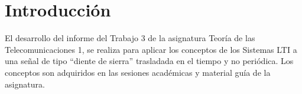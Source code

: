\section{Introducción}\label{intro}
   El desarrollo del informe del Trabajo 3 de la asignatura Teoría de las Telecomunicaciones 1, se realiza para aplicar los conceptos de los Sistemas LTI a una señal de tipo ``diente de sierra'' trasladada en el tiempo y no periódica. Los conceptos son adquiridos en las sesiones académicas y material guía de la asignatura.
    
    